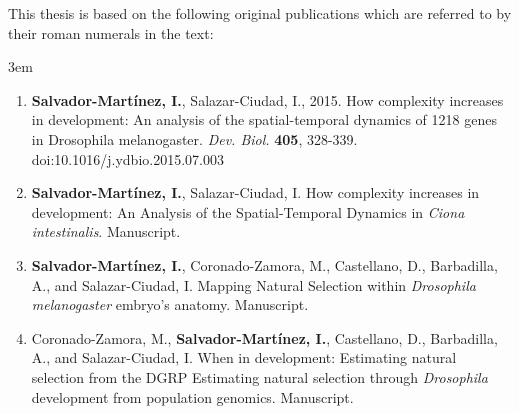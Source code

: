 
\vspace{1cm}

This thesis is based on the following original publications which are referred to by their roman numerals in the text:

\vspace{1.5cm}

%
\renewcommand*{\thefootnote}{\fnsymbol{footnote}}

\begin{flushleft}
\leftskip3em
\rightskip\leftskip
\normalsize{

\begin{enumerate}[label=\Roman*]
  \item  \textbf{Salvador-Mart\'{i}nez, I.}, Salazar-Ciudad, I., 2015. 
  How complexity increases in development: An analysis of the spatial-temporal dynamics of 1218 genes in Drosophila melanogaster.
   \textit{Dev. Biol.} \textbf{405}, 328-339. doi:10.1016/j.ydbio.2015.07.003
  \vspace{0.5cm}
    
  \item  \textbf{Salvador-Mart\'{i}nez, I.}, Salazar-Ciudad, I. 
  How complexity increases in development: An Analysis of the Spatial-Temporal Dynamics in \textit{Ciona intestinalis}. Manuscript.
  \vspace{0.5cm}

  \item \textbf{Salvador-Mart\'{i}nez, I.\footnotemark[1]}, Coronado-Zamora, M.\footnotemark[1], Castellano, D.\footnotemark[1], Barbadilla, A., and Salazar-Ciudad, I. 
  Mapping Natural Selection within \textit{Drosophila melanogaster} embryo's anatomy.
   Manuscript.
  \vspace{0.5cm}
  
  \item  Coronado-Zamora, M.\footnotemark[1], \textbf{Salvador-Mart\'{i}nez, I.\footnotemark[1]}, Castellano, D., Barbadilla, A., and Salazar-Ciudad, I. 
  When in development: Estimating natural selection from the DGRP Estimating natural selection through \textit{Drosophila} development from population genomics.
Manuscript.
  
\end{enumerate}
%
\renewcommand*{\thefootnote}{\arabic{footnote}}
%
}
\end{flushleft}

